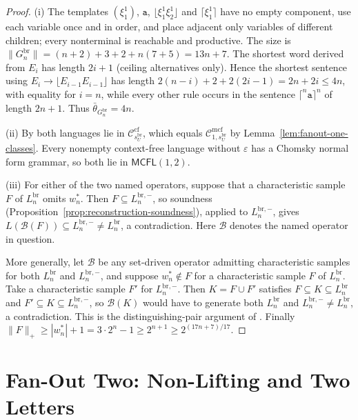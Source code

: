 \documentclass[11pt]{article}
\numberwithin{equation}{section}
\theoremstyle{plain}
\theoremstyle{definition}
\theoremstyle{remark}
\newcommand{\Cmcf}[2]{\mathcal{C}^{\mathrm{mcf}}_{#1,#2}}
\newcommand{\eps}{\varepsilon}
\theoremstyle{plain}
\begin{document}
\begin{proof}
(i) The templates $(\xi_1^1)$, $\mathtt a$,
$\lfloor\xi_1^1\xi_2^1\rfloor$ and $\lceil\xi_1^1\rceil$ have no empty
component, use each variable once and in order, and place adjacent only
variables of different children; every nonterminal is reachable and
productive.  The size is
$\|G^{\mathrm{br}}_n\|=(n+2)+3+2+n(7+5)=13n+7$.  The shortest word derived from $E_i$
has length $2i+1$ (ceiling alternatives only).  Hence the shortest
sentence using $E_i\to\lfloor E_{i-1}E_{i-1}\rfloor$ has length
$2(n-i)+2+2(2i-1)=2n+2i\le4n$, with equality for $i=n$, while every other
rule occurs in the sentence $\lceil^n\mathtt a\rceil^n$ of length $2n+1$.
Thus $\bar\theta_{G^{\mathrm{br}}_n}=4n$.

(ii) By \cite[Proposition~6.4(i),(iv)]{kuriyamaCFG} both languages lie in
$\mathcal C^{\mathrm{cf}}_{s^{\mathrm{br}}_U}$, which equals $\Cmcf{1}{s^{\mathrm{br}}_U}$ by
Lemma~\ref{lem:fanout-one-classes}.  Every nonempty context-free language
without $\eps$ has a Chomsky normal form grammar, so both lie in
$\mathsf{MCFL}(1,2)$.

(iii) For either of the two named operators, suppose that a
characteristic sample $F$ of $L^{\mathrm{br}}_n$ omits $w_n^*$.  Then
$F\subseteq L^{\mathrm{br},-}_n$, so soundness
(Proposition~\ref{prop:reconstruction-soundness}), applied to $L^{\mathrm{br},-}_n$,
gives $L(\mathcal B(F))\subseteq L^{\mathrm{br},-}_n\ne L^{\mathrm{br}}_n$, a contradiction.
Here $\mathcal B$ denotes the named operator in question.

More generally, let $\mathcal B$ be any set-driven operator admitting
characteristic samples for both $L^{\mathrm{br}}_n$ and $L^{\mathrm{br},-}_n$, and suppose
$w_n^*\notin F$ for a characteristic sample $F$ of $L^{\mathrm{br}}_n$.
Take a characteristic sample $F'$ for $L^{\mathrm{br},-}_n$.
Then $K=F\cup F'$ satisfies $F\subseteq K\subseteq L^{\mathrm{br}}_n$ and
$F'\subseteq K\subseteq L^{\mathrm{br},-}_n$, so $\mathcal B(K)$ would have to
generate both $L^{\mathrm{br}}_n$ and $L^{\mathrm{br},-}_n\ne L^{\mathrm{br}}_n$, a contradiction.
This is the distinguishing-pair argument of
\cite[Proposition~6.4(iv)]{kuriyamaCFG}.  Finally
$\|F\|_+\ge|w^*_n|+1=3\cdot2^n-1\ge2^{n+1}\ge2^{(17n+7)/17}$.
\end{proof}


\section{Fan-Out Two: Non-Lifting and Two Letters}
\label{sec:fanout-two}
\label{subsec:power-transfer}
\end{document}
